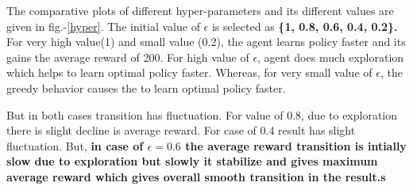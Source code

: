 \documentclass[preprint,12pt]{elsarticle}
\begin{document}
	 The comparative plots of different hyper-parameters and its different values are given in fig.-\ref{hyper}. The initial value of $\epsilon$ is selected as \textbf{\{1, 0.8, 0.6, 0.4, 0.2\}.} For very high value(1) and small value (0.2), the agent learns policy faster and its gains the average reward of 200. For high value of $\epsilon$, agent does much exploration which helps to learn optimal policy faster. Whereas, for very small value of $\epsilon$, the greedy behavior causes the to learn optimal policy faster.
	 
	  But in both cases transition has fluctuation. For value of 0.8, due to exploration there is slight decline is average reward. For case of 0.4 result has slight fluctuation. But, \textbf{in case of $\epsilon = 0.6$ the average reward transition is intially slow due to exploration but slowly it stabilize and gives maximum average reward which gives overall smooth transition in the result.s}
	  
	  
 
\end{document}
